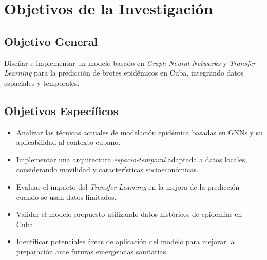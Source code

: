 \section*{Objetivos de la Investigación}
\subsection*{Objetivo General}
Diseñar e implementar un modelo basado en \textit{Graph Neural Networks} y \textit{Transfer Learning} para la predicción de brotes epidémicos en Cuba, integrando datos espaciales y temporales.

\subsection*{Objetivos Específicos}
\begin{itemize}
    \item Analizar las técnicas actuales de modelación epidémica basadas en GNNs y su aplicabilidad al contexto cubano.
    \item Implementar una arquitectura \textit{espacio-temporal} adaptada a datos locales, considerando movilidad y características socioeconómicas.
    \item Evaluar el impacto del \textit{Transfer Learning} en la mejora de la predicción cuando se usan datos limitados.
    \item Validar el modelo propuesto utilizando datos históricos de epidemias en Cuba.
    \item Identificar potenciales áreas de aplicación del modelo para mejorar la preparación ante futuras emergencias sanitarias.
\end{itemize}